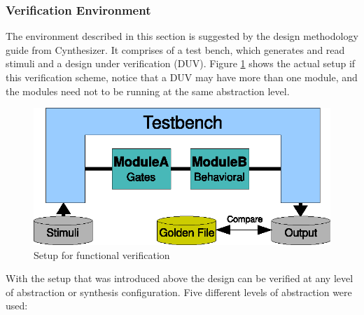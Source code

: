 \documentclass[a4paper, 12pt]{article}
\begin{document}
\subsubsection{Verification Environment}

The environment described in this section is suggested by the design methodology guide from Cynthesizer. It comprises of a test bench, which generates and read stimuli and a design under verification (DUV). Figure \ref{fig:tbduv} shows the actual setup if this verification scheme, notice that a DUV may have more than one module, and the modules need not to be running at the same abstraction level. 

\begin{figure}[h]
\centering
\includegraphics{figs/testbench.eps}
\caption{Setup for functional verification}
\label{fig:tbduv}
\end{figure}

With the setup that was introduced above the design can be verified at any level of abstraction or synthesis configuration. Five different levels of abstraction were used:
\end{document}
